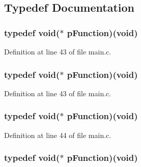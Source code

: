 \subsection{Typedef Documentation}
\hypertarget{group___revolution_b_l_ga9227bf1f1a9c633a0cc9ca50cc761c1a}{
\subsubsection[{p\-Function}]{\setlength{\rightskip}{0pt plus 5cm}typedef {\bf void}($\ast$ p\-Function)({\bf void})}}\label{group___revolution_b_l_ga9227bf1f1a9c633a0cc9ca50cc761c1a}


Definition at line 43 of file main.\-c.

\hypertarget{group___revolution_b_l_ga9227bf1f1a9c633a0cc9ca50cc761c1a}{
\subsubsection[{p\-Function}]{\setlength{\rightskip}{0pt plus 5cm}typedef {\bf void}($\ast$ p\-Function)({\bf void})}}\label{group___revolution_b_l_ga9227bf1f1a9c633a0cc9ca50cc761c1a}


Definition at line 43 of file main.\-c.

\hypertarget{group___revolution_b_l_ga9227bf1f1a9c633a0cc9ca50cc761c1a}{
\subsubsection[{p\-Function}]{\setlength{\rightskip}{0pt plus 5cm}typedef {\bf void}($\ast$ p\-Function)({\bf void})}}\label{group___revolution_b_l_ga9227bf1f1a9c633a0cc9ca50cc761c1a}


Definition at line 44 of file main.\-c.

\hypertarget{group___revolution_b_l_ga9227bf1f1a9c633a0cc9ca50cc761c1a}{
\subsubsection[{p\-Function}]{\setlength{\rightskip}{0pt plus 5cm}typedef {\bf void}($\ast$ p\-Function)({\bf void})}}\label{group___revolution_b_l_ga9227bf1f1a9c633a0cc9ca50cc761c1a}



